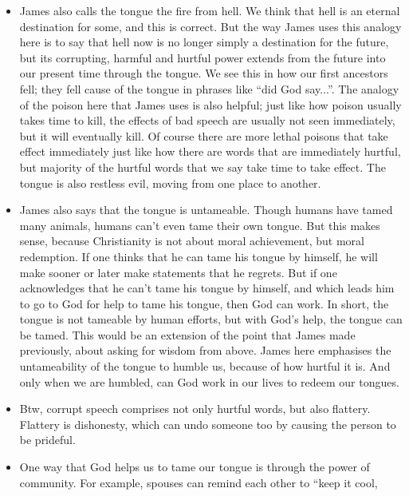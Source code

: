 \begin{itemize}
{  staining, destructive effect of the tongue is on both the hearers and the
  speakers. The hearers can be hurt for decades by hurtful words, and the
  speakers can regret those words for decades.}
  \item{James also calls the tongue the fire from hell. We think that hell is
  an eternal destination for some, and this is correct. But the way James
  uses this analogy here is to say that hell now is no longer simply a
  destination for the future, but its corrupting, harmful and hurtful power
  extends from the future into our present time through the tongue. We see
  this in how our first ancestors fell; they fell cause of the tongue in
  phrases like ``did God say...''. The analogy of the poison here that James
  uses is also helpful; just like how poison usually takes time to kill, the
  effects of bad speech are usually not seen immediately, but it will
  eventually kill. Of course there are more lethal poisons that take effect
  immediately just like how there are words that are immediately hurtful, but
  majority of the hurtful words that we say take time to take effect. The tongue is also restless evil, moving from one place to another. }
  \item{James also says that the tongue is untameable. Though humans have
  tamed many animals, humans can't even tame their own tongue. But this makes
  sense, because Christianity is not about moral achievement, but moral
  redemption. If one thinks that he can tame his tongue by himself, he will
  make sooner or later make statements that he regrets. But if one
  acknowledges that he can't tame his tongue by himself, and which leads him
  to go to God for help to tame his tongue, then God can work. In short, the
  tongue is not tameable by human efforts, but with God's help, the tongue
  can be tamed. This would be an extension of the point that James made
  previously, about asking for wisdom from above. James here emphasises the
  untameability of the tongue to humble us, because of how hurtful it is. And
  only when we are humbled, can God work in our lives to redeem our tongues.}
  \item{Btw, corrupt speech comprises not only hurtful words, but also
  flattery. Flattery is dishonesty, which can undo someone too by causing the
  person to be prideful. }
  \item{One way that God helps us to tame our tongue is through the power of
  community. For example, spouses can remind each other to ``keep it cool,
}
\end{itemize}
